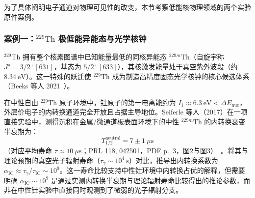 为了具体阐明电子通道对物理可见性的改变，本节考察低能核物理领域的两个实验原件案例。

\subsubsection{案例一：$^{229}\mathrm{Th}$ 极低能异能态与光学核钟}

$^{229}\mathrm{Th}$ 拥有整个核素图谱中已知能量最低的同核异能态 $^{229m}\mathrm{Th}$（自旋宇称 $J^\pi = 3/2^+ [631]$，基态为 $5/2^+ [633]$），其核激发能量处于真空紫外波段（约 $8.34\ \mathrm{eV}$）。这一特殊的跃迁使 $^{229}\mathrm{Th}$ 成为制造高精度固态光学核钟的核心候选体系（Beeks 等人 2021~\cite{beeks-2021-thorium-229-isomer-nuclear-clock}）。

在中性自由 $^{229}\mathrm{Th}$ 原子环境中，钍原子的第一电离能约为 $I_1 \approx 6.3\ \mathrm{eV} < \Delta E_{\mathrm{nuc}}$，外层价电子的内转换通道完全开放且占据主导地位。Seiferle 等人（2017）在一项直接实验中，测得沉积在金属/微通道板表面环境下的中性 $^{229m}\mathrm{Th}$ 的内转换衰变半衰期为：
\begin{equation}\label{eq:4-8-seiferle-half-life}
T_{1/2}^{\mathrm{neutral}} = 7 \pm 1\ \mu\mathrm{s}
\end{equation}
（对应平均寿命 $\tau \approx 10\ \mu\mathrm{s}$；PRL 118, 042501，PDF p.~3，图2与图3）~\cite{seiferle-2017-lifetime-229th-isomer}。将其与理论预期的真空光子辐射寿命（$\tau_\gamma \sim 10^4\ \mathrm{s}$）对比，推导出内转换系数为 $\alpha_{\mathrm{IC}} \approx \tau_\gamma / \tau_{\mathrm{IC}} \sim 10^9$。这一寿命比较支持中性钍环境中内转换占优的解释，但需要明确 $\alpha_{\mathrm{IC}} \sim 10^9$ 是通过实测内转换半衰期与理论辐射寿命比较得出的推论参数，而非在中性钍实验中直接同时观测到了微弱的光子辐射分支。

